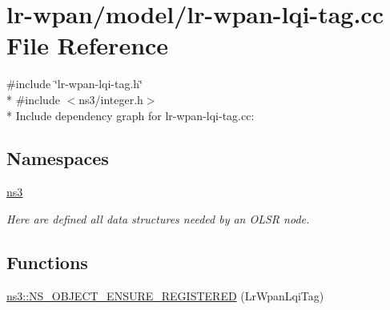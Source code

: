 \hypertarget{lr-wpan-lqi-tag_8cc}{}\section{lr-\/wpan/model/lr-\/wpan-\/lqi-\/tag.cc File Reference}
\label{lr-wpan-lqi-tag_8cc}
{\ttfamily \#include \char`\"{}lr-\/wpan-\/lqi-\/tag.\+h\char`\"{}}\\*
{\ttfamily \#include $<$ns3/integer.\+h$>$}\\*
Include dependency graph for lr-\/wpan-\/lqi-\/tag.cc\+:
\subsection*{Namespaces}
\begin{DoxyCompactItemize}
\item 
 \hyperlink{namespacens3}{ns3}
\begin{DoxyCompactList}\small\item\em Here are defined all data structures needed by an O\+L\+SR node. \end{DoxyCompactList}\end{DoxyCompactItemize}
\subsection*{Functions}
\begin{DoxyCompactItemize}
\item 
\hyperlink{namespacens3_af2c890ac9b13890bf32d5265c27d2cb3}{ns3\+::\+N\+S\+\_\+\+O\+B\+J\+E\+C\+T\+\_\+\+E\+N\+S\+U\+R\+E\+\_\+\+R\+E\+G\+I\+S\+T\+E\+R\+ED} (Lr\+Wpan\+Lqi\+Tag)
\end{DoxyCompactItemize}
